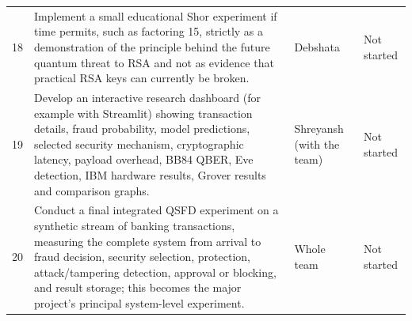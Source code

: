 \begin{longtable}{@{}p{0.6cm}p{7.2cm}p{2.0cm}p{3.2cm}@{}}
18 & Implement a small educational Shor experiment if time permits, such as factoring 15, strictly as a demonstration of the principle behind the future quantum threat to RSA and not as evidence that practical RSA keys can currently be broken. & Debshata & Not started\\
19 & Develop an interactive research dashboard (for example with Streamlit) showing transaction details, fraud probability, model predictions, selected security mechanism, cryptographic latency, payload overhead, BB84 QBER, Eve detection, IBM hardware results, Grover results and comparison graphs. & Shreyansh (with the team) & Not started\\
20 & Conduct a final integrated QSFD experiment on a synthetic stream of banking transactions, measuring the complete system from arrival to fraud decision, security selection, protection, attack/tampering detection, approval or blocking, and result storage; this becomes the major project's principal system-level experiment. & Whole team & Not started\\
\bottomrule
\end{longtable}

